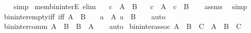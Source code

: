 \begin{isabellebody}
%
\isadelimproof
\ \ %
\endisadelimproof
%
\isatagproof
{}\isamarkupfalse%
\ simp%
\endisatagproof
{\isafoldproof}%
%
\isadelimproof
\isanewline
%
\endisadelimproof
\isanewline
{}\isamarkupfalse%
\ mem{\isacharunderscore}{\kern0pt}bin{\isacharunderscore}{\kern0pt}interE\ {\isacharbrackleft}{\kern0pt}elim{\isacharbang}{\kern0pt}{\isacharbrackright}{\kern0pt}{\isacharcolon}{\kern0pt}\isanewline
\ \ \ {\isachardoublequoteopen}c\ {\isasymin}\ A\ {\isasyminter}\ B{\isachardoublequoteclose}\isanewline
\ \ \ {\isachardoublequoteopen}c\ {\isasymin}\ A{\isachardoublequoteclose}\ \ {\isachardoublequoteopen}c\ {\isasymin}\ B{\isachardoublequoteclose}\isanewline
%
\isadelimproof
\ \ %
\endisadelimproof
%
\isatagproof
{}\isamarkupfalse%
\ assms\ \isamarkupfalse%
\ simp%
\endisatagproof
{\isafoldproof}%
%
\isadelimproof
\isanewline
%
\endisadelimproof
\isanewline
{}\isamarkupfalse%
\ bin{\isacharunderscore}{\kern0pt}inter{\isacharunderscore}{\kern0pt}empty{\isacharunderscore}{\kern0pt}iff\ {\isacharbrackleft}{\kern0pt}iff{\isacharbrackright}{\kern0pt}{\isacharcolon}{\kern0pt}\ {\isachardoublequoteopen}A\ {\isasyminter}\ B\ {\isacharequal}{\kern0pt}\ {\isacharbraceleft}{\kern0pt}{\isacharbraceright}{\kern0pt}\ {\isasymlongleftrightarrow}\ {\isacharparenleft}{\kern0pt}{\isasymforall}a\ {\isasymin}\ A{\isachardot}{\kern0pt}\ a\ {\isasymnotin}\ B{\isacharparenright}{\kern0pt}{\isachardoublequoteclose}\isanewline
%
\isadelimproof
\ \ %
\endisadelimproof
%
\isatagproof
{}\isamarkupfalse%
\ auto%
\endisatagproof
{\isafoldproof}%
%
\isadelimproof
\isanewline
%
\endisadelimproof
\isanewline
{}\isamarkupfalse%
\ bin{\isacharunderscore}{\kern0pt}inter{\isacharunderscore}{\kern0pt}comm{\isacharcolon}{\kern0pt}\ {\isachardoublequoteopen}A\ {\isasyminter}\ B\ {\isacharequal}{\kern0pt}\ B\ {\isasyminter}\ A{\isachardoublequoteclose}\isanewline
%
\isadelimproof
\ \ %
\endisadelimproof
%
\isatagproof
{}\isamarkupfalse%
\ auto%
\endisatagproof
{\isafoldproof}%
%
\isadelimproof
\isanewline
%
\endisadelimproof
\isanewline
{}\isamarkupfalse%
\ bin{\isacharunderscore}{\kern0pt}inter{\isacharunderscore}{\kern0pt}assoc{\isacharcolon}{\kern0pt}\ {\isachardoublequoteopen}{\isacharparenleft}{\kern0pt}A\ {\isasyminter}\ B{\isacharparenright}{\kern0pt}\ {\isasyminter}\ C\ {\isacharequal}{\kern0pt}\ A\ {\isasyminter}\ {\isacharparenleft}{\kern0pt}B\ {\isasyminter}\ C{\isacharparenright}{\kern0pt}{\isachardoublequoteclose}\isanewline

\end{isabellebody}
